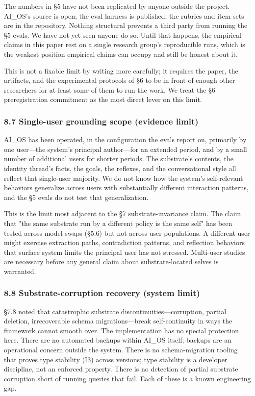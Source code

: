 \documentclass[11pt,letterpaper]{article}
\begin{document}
The numbers in §5 have not been replicated by anyone outside the project. AI\_OS's source is open; the eval harness is published; the rubrics and item sets are in the repository. Nothing structural prevents a third party from running the §5 evals. We have not yet seen anyone do so. Until that happens, the empirical claims in this paper rest on a single research group's reproducible runs, which is the weakest position empirical claims can occupy and still be honest about it.

This is not a fixable limit by writing more carefully; it requires the paper, the artifacts, and the experimental protocols of §6 to be in front of enough other researchers for at least some of them to run the work. We treat the §6 preregistration commitment as the most direct lever on this limit.

\subsubsection*{8.7 Single-user grounding scope (evidence limit)}

AI\_OS has been operated, in the configuration the evals report on, primarily by one user---the system's principal author---for an extended period, and by a small number of additional users for shorter periods. The substrate's contents, the identity thread's facts, the goals, the reflexes, and the conversational style all reflect that single-user majority. We do not know how the system's self-relevant behaviors generalize across users with substantially different interaction patterns, and the §5 evals do not test that generalization.

This is the limit most adjacent to the §7 substrate-invariance claim. The claim that "the same substrate run by a different policy is the same self" has been tested across model swaps (§5.6) but not across user populations. A different user might exercise extraction paths, contradiction patterns, and reflection behaviors that surface system limits the principal user has not stressed. Multi-user studies are necessary before any general claim about substrate-located selves is warranted.

\subsubsection*{8.8 Substrate-corruption recovery (system limit)}

§7.8 noted that catastrophic substrate discontinuities---corruption, partial deletion, irrecoverable schema migrations---break self-continuity in ways the framework cannot smooth over. The implementation has no special protection here. There are no automated backups within AI\_OS itself; backups are an operational concern outside the system. There is no schema-migration tooling that proves type stability (I3) across versions; type stability is a developer discipline, not an enforced property. There is no detection of partial substrate corruption short of running queries that fail. Each of these is a known engineering gap.
\end{document}
